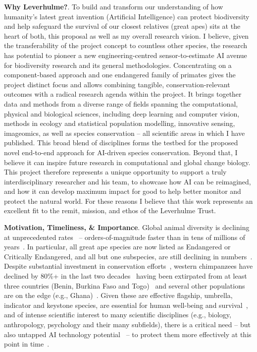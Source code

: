 \textbf{Why Leverhulme?}. To build and transform our understanding of how humanity’s latest great invention (Artificial Intelligence) can protect biodiversity and help safeguard the survival of our closest relatives (great apes) sits at the heart of both, this proposal as well as my overall research vision. I believe, given the transferability of the project concept to countless other species, the research has potential to pioneer a new engineering-centred sensor-to-estimate AI avenue for biodiversity research and its general methodologies. Concentrating on a component-based approach and one endangered family of primates gives the project distinct focus and allows combining tangible, conservation-relevant outcomes with a radical research agenda within the project. It brings together data and methods from a diverse range of fields spanning the computational, physical and biological sciences, including deep learning and computer vision, methods in ecology and statistical population modelling, innovative sensing, imageomics, as well as species conservation – all scientific areas in which I have published. This broad blend of disciplines forms the testbed for the proposed novel end-to-end approach for AI-driven species conservation. Beyond that, I believe it can inspire future research in computational and global change biology. This project therefore represents a unique opportunity to support a truly interdisciplinary researcher and his team, to showcase how AI can be reimagined, and how it can develop maximum impact for good to help better monitor and protect the natural world. For these reasons I believe that this work represents an excellent fit to the remit, mission, and ethos of the Leverhulme Trust.

\textbf{Motivation, Timeliness, \& Importance}. Global animal diversity is declining at unprecedented rates~\cite{Tuia2022} -- orders-of-magnitude faster than in tens of millions of years~\cite{Ceballos2020}. In particular, all great ape species are now listed as Endangered or Critically Endangered, and all but one subspecies, are still declining in numbers~\cite{Hockings2015}. Despite substantial investment in conservation efforts~\cite{Bettinger2021}, western chimpanzees have declined by 80\%+ in the last two decades~\cite{Kuhl2017} having been extirpated from at least three countries (Benin, Burkina Faso and Togo)~\cite{Ginn2013,Campbell2015} and several other populations are on the edge (e.g., Ghana)~\cite{Kuhl2017}. Given these are effective flagship, umbrella, indicator and keystone species, are essential for human well-being and survival~\cite{MEA2005}, and of intense scientific interest to many scientific disciplines (e.g., biology, anthropology, psychology and their many subfields), there is a critical need -- but also untapped AI technology potential~\cite{Tuia2022} -- to protect them more effectively at this point in time~\cite{Paine1969,Tutin1991,Clucas2008}.

